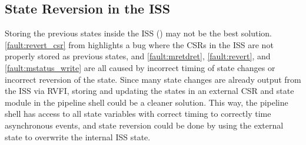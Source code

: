 \subsection{State Reversion in the ISS}

Storing the previous states inside the ISS () may not be the best solution. \ref{fault:revert_csr} from  highlights a bug where the CSRs in the ISS are not properly stored as previous states, and \ref{fault:mretdret},  \ref{fault:revert}, and \ref{fault:mstatus_write} are all caused by incorrect timing of state changes or incorrect reversion of the state. Since many state changes are already output from the ISS via RVFI, storing and updating the states in an external CSR and state module in the pipeline shell could be a cleaner solution. This way, the pipeline shell has access to all state variables with correct timing to correctly time asynchronous events, and state reversion could be done by using the external state to overwrite the internal ISS state. 





%
%